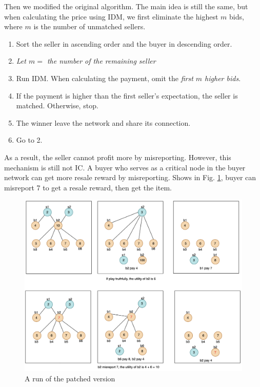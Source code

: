 \documentclass[format=acmsmall, review=false, natbib=false]{acmart}
\begin{document}
Then we modified the original algorithm. The main idea is still the same, but when calculating
the price using IDM, we first eliminate the highest \(m\) bids, where \(m\) is the number of unmatched sellers.
\begin{tcolorbox}[title=Algorithm: Resale mechanism with Leave and Share - 2]
	\begin{enumerate}
		\item Sort the seller in ascending order and the buyer in descending order.
		\item \emph{Let \(m = \) the number of the remaining seller}
		\item Run IDM. When calculating the payment, omit the \emph{first \(m\) higher bids}.
		\item If the payment is higher than the first seller's expectation, the seller is matched.
		      Otherwise, stop.
		\item The winner leave the network and share its connection.
		\item Go to 2.
	\end{enumerate}
\end{tcolorbox}
As a result, the seller cannot profit more by misreporting. However, this mechanism is still not IC. A buyer who serves as a critical node in the buyer network can get more resale reward by misreporting. Shows in Fig. \ref{fig:IDMcounter2}, buyer can misreport 7 to get a resale reward, then get the item.
\begin{figure}
	\centering
	\includegraphics[width = \textwidth]{image/IDMCounter2.png}
	\caption{A run of the patched version}
	\label{fig:IDMcounter2}
\end{figure}
\end{document}
